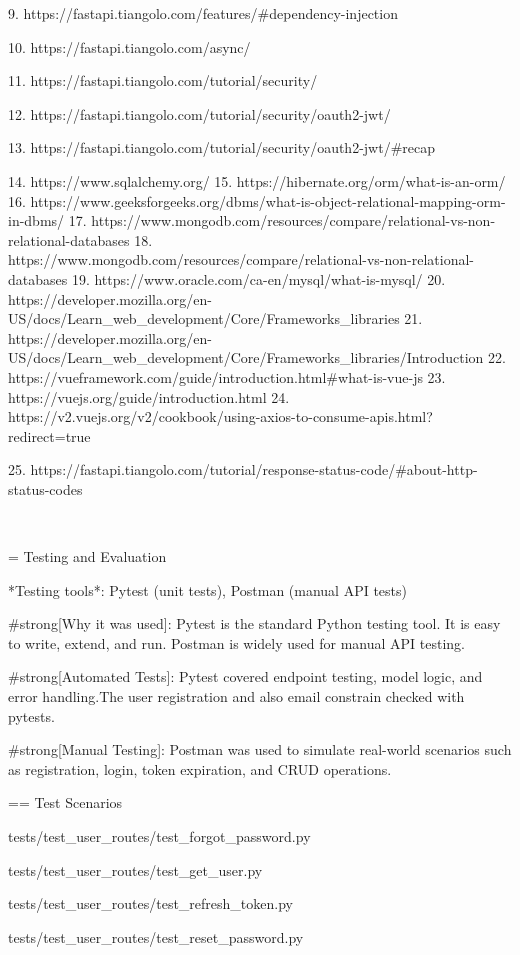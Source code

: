 9. https://fastapi.tiangolo.com/features/#dependency-injection

10. https://fastapi.tiangolo.com/async/

11. https://fastapi.tiangolo.com/tutorial/security/

12. https://fastapi.tiangolo.com/tutorial/security/oauth2-jwt/

13. https://fastapi.tiangolo.com/tutorial/security/oauth2-jwt/#recap

14. https://www.sqlalchemy.org/
15. https://hibernate.org/orm/what-is-an-orm/
16. https://www.geeksforgeeks.org/dbms/what-is-object-relational-mapping-orm-in-dbms/
17. https://www.mongodb.com/resources/compare/relational-vs-non-relational-databases
18. https://www.mongodb.com/resources/compare/relational-vs-non-relational-databases
19. https://www.oracle.com/ca-en/mysql/what-is-mysql/
20. https://developer.mozilla.org/en-US/docs/Learn_web_development/Core/Frameworks_libraries
21. https://developer.mozilla.org/en-US/docs/Learn_web_development/Core/Frameworks_libraries/Introduction
22. https://vueframework.com/guide/introduction.html#what-is-vue-js
23. https://vuejs.org/guide/introduction.html
24. https://v2.vuejs.org/v2/cookbook/using-axios-to-consume-apis.html?redirect=true

25. https://fastapi.tiangolo.com/tutorial/response-status-code/#about-http-status-codes

\
\
\
\
\
\
\
\
\

= Testing and Evaluation

*Testing tools*: Pytest (unit tests), Postman (manual API tests)

#strong[Why it was used]: Pytest is the standard Python testing tool. It is easy to write, extend, and run. Postman is widely used for manual API testing.


#strong[Automated Tests]: Pytest covered endpoint testing, model logic, and error handling.The user registration and also email constrain checked with pytests.

#strong[Manual Testing]: Postman was used to simulate real-world scenarios such as registration, login, token expiration, and CRUD operations.

== Test Scenarios

tests/test_user_routes/test_forgot_password.py 

tests/test_user_routes/test_get_user.py 

tests/test_user_routes/test_refresh_token.py 

tests/test_user_routes/test_reset_password.py 

